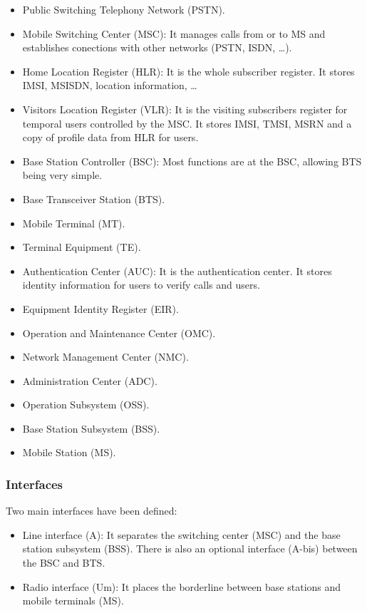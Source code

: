 \documentclass[../main.tex]{subfiles}
\begin{document}
\begin{itemize}
	\item Public Switching Telephony Network (PSTN).
	\item Mobile Switching Center (MSC): It manages calls from or to MS and establishes conections with other networks (PSTN, ISDN, \ldots).
	\item Home Location Register (HLR): It is the whole subscriber register. It stores IMSI, MSISDN, location information, \ldots
	\item Visitors Location Register (VLR): It is the visiting subscribers register for temporal users controlled by the MSC. It stores IMSI, TMSI, MSRN and a copy of profile data from HLR for users.
	\item Base Station Controller (BSC): Most functions are at the BSC, allowing BTS being very simple.
	\item Base Transceiver Station (BTS).
	\item Mobile Terminal (MT).
	\item Terminal Equipment (TE).
	\item Authentication Center (AUC): It is the authentication center. It stores identity information for users to verify calls and users.
	\item Equipment Identity Register (EIR).
	\item Operation and Maintenance Center (OMC).
	\item Network Management Center (NMC).
	\item Administration Center (ADC).
	\item Operation Subsystem (OSS).
	\item Base Station Subsystem (BSS).
	\item Mobile Station (MS).
\end{itemize}

\subsubsection{Interfaces}

Two main interfaces have been defined:

\begin{itemize}
	\item Line interface (A): It separates the switching center (MSC) and the base station subsystem (BSS). There is also an optional interface (A-bis) between the BSC and BTS.
	\item Radio interface (Um): It places the borderline between base stations and mobile terminals (MS).
\end{itemize}
\end{document}
